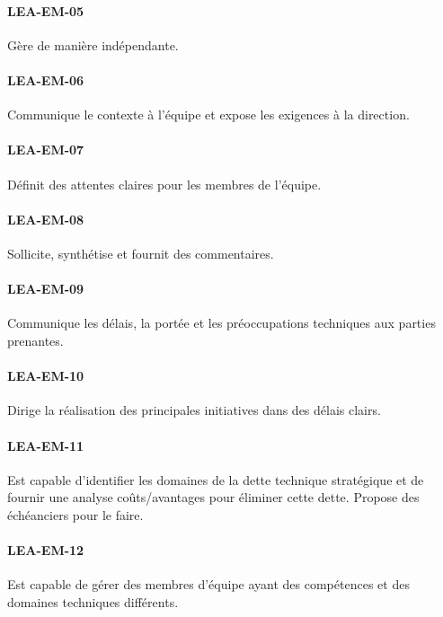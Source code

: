 \documentclass[a4paper, french, openany, 12pt]{book}
\newcommand\cha[1]{\textcolor{OliveGreen}{\textbf{\uppercase{lea-{#1}}}}}
\begin{document}
\begin{multicols}{2}
  \paragraph*{\cha{em-05}}

  Gère de manière indépendante.
  
  \paragraph*{\cha{em-06}}

  Communique le contexte à l'équipe et expose les exigences à la direction.

  \paragraph*{\cha{em-07}}

  Définit des attentes claires pour les membres de l'équipe.
  
  \paragraph*{\cha{em-08}}

  Sollicite, synthétise et fournit des commentaires.
  
  \paragraph*{\cha{em-09}}

  Communique les délais, la portée et les préoccupations techniques aux parties prenantes.
  
  \paragraph*{\cha{em-10}}

  Dirige la réalisation des principales initiatives dans des délais clairs.
  
  \paragraph*{\cha{em-11}}

  Est capable d'identifier les domaines de la dette technique stratégique et de fournir une analyse coûts/avantages pour 
  éliminer cette dette.
  Propose des échéanciers pour le faire.
  
  \paragraph*{\cha{em-12}}

  Est capable de gérer des membres d'équipe ayant des compétences et des domaines techniques différents.

\end{multicols}
\end{document}
